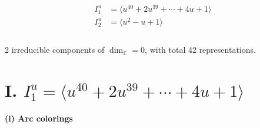 \documentclass[1p]{elsarticle_modified}
\theoremstyle{definition}
\begin{document}
\begin{align*}
I^u_{1}&=\langle 
u^{40}+2 u^{39}+\cdots+4 u+1\rangle \\
I^u_{2}&=\langle 
u^2- u+1\rangle \\
\\
\end{align*}
\raggedright * 2 irreducible components of $\dim_{\mathbb{C}}=0$, with total 42 representations.\\
\newpage
\renewcommand{\arraystretch}{1}
\centering \section*{I. $I^u_{1}= \langle u^{40}+2 u^{39}+\cdots+4 u+1 \rangle$}
\flushleft \textbf{(i) Arc colorings}\\
\end{document}
